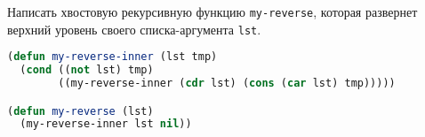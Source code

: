 Написать хвостовую рекурсивную функцию \verb|my-reverse|, которая развернет верхний
уровень своего списка-аргумента \verb|lst|.

\begin{lstlisting}[language=Lisp]
(defun my-reverse-inner (lst tmp)
  (cond ((not lst) tmp)
        ((my-reverse-inner (cdr lst) (cons (car lst) tmp)))))

(defun my-reverse (lst)
  (my-reverse-inner lst nil))
\end{lstlisting}

